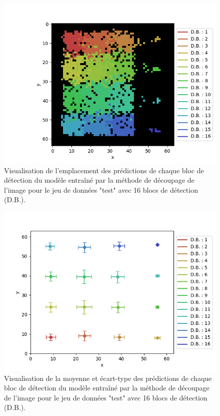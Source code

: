 \begin{figure}[hbt!]
    \centering
    \includegraphics[scale=0.7]{Figures/visulization_prediction_4_n_neurons.png}
    \caption{Visualisation de l'emplacement des prédictions de chaque bloc de détection du modèle entraîné par la méthode de découpage de l'image pour le jeu de données "test" avec 16 blocs de détection (D.B.).}
    \label{fig:visulization_prediction_4_n_neurons}
\end{figure}

\begin{figure}[hbt!]
    \centering
    \includegraphics[scale=0.7]{Figures/visulization_prediction_4_n_neurons_mean_std.png}
    \caption{Visualisation de la moyenne et écart-type des prédictions de chaque bloc de détection du modèle entraîné par la méthode de découpage de l'image pour le jeu de données "test" avec 16 blocs de détection (D.B.).}
    \label{fig:visulization_prediction_4_n_neurons_mean_std}
\end{figure}

